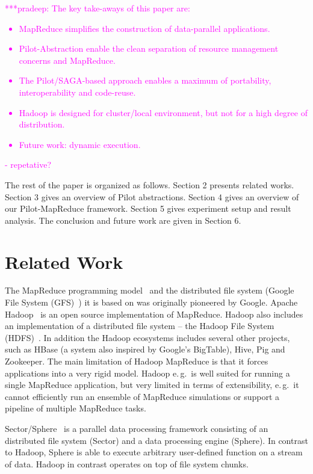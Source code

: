 \documentclass{acm_proc_article-sp}
\newcommand{\pnote}[1]{ {\textcolor{magenta} { ***pradeep: #1 }}}
\newcommand{\pnote}[1]{}
\newcommand{\pilot}{Pilot\xspace}
\newcommand{\pilotmapreduce}{Pilot-MapReduce\xspace}
\begin{document}
\pnote{The key take-aways of this paper are:
\begin{itemize}
	\item MapReduce simplifies the construction of data-parallel applications.
	\item Pilot-Abstraction enable the clean separation of resource management concerns and MapReduce.
	\item The Pilot/SAGA-based approach enables a maximum of portability, interoperability and code-reuse.
	\item Hadoop is designed for cluster/local environment, but not for a high degree of distribution.
	\item Future work: dynamic execution.
\end{itemize}  - repetative? }

The rest of the paper is organized as follows. Section 2 presents related works. Section 3 gives an overview of \pilot abstractions. Section 4 gives an overview of our \pilotmapreduce framework. Section 5 gives experiment setup and result analysis. The conclusion and future work are given in Section 6.

\section{Related Work}

The MapReduce programming model~\cite{Dean:2004:MSD:1251254.1251264} and the
distributed file system (Google File System
(GFS)~\cite{Ghemawat:2003:GFS:1165389.945450}) it is based on was originally
pioneered by Google. Apache Hadoop~\cite{hadoop} is an open source
implementation of MapReduce. Hadoop also includes an implementation of a
distributed file system -- the Hadoop File System
(HDFS)~\cite{Borthakur:2007fk}. In addition the Hadoop ecosystems includes
several other projects, such as HBase (a system also inspired by Google's
BigTable), Hive, Pig and Zookeeper. The main limitation of Hadoop MapReduce is that it forces
applications into a very rigid model. Hadoop e.\,g.\ is well suited for
running a single MapReduce application, but very limited in terms 
of extensibility, e.\,g.\ it cannot efficiently run an ensemble of MapReduce 
simulations or support a pipeline of multiple MapReduce tasks.

Sector/Sphere~\cite{Gu_Grossman_2009} is a parallel data processing framework
consisting of an distributed file system (Sector) and a data processing engine
(Sphere). In contrast to Hadoop, Sphere is able to execute arbitrary 
user-defined function on a stream of data. Hadoop in contrast operates on top 
of file system chunks.
\end{document}
